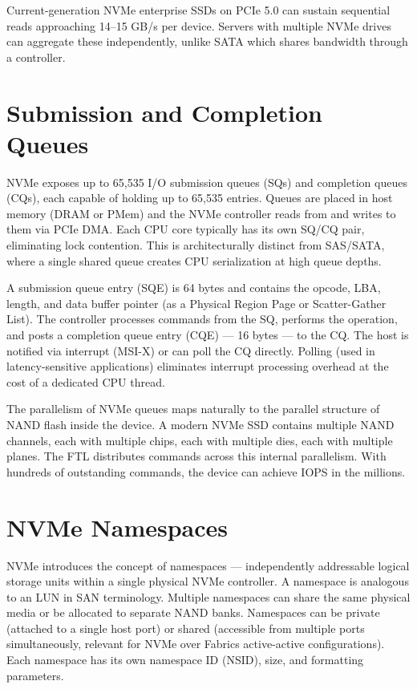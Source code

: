 Current-generation NVMe enterprise SSDs on PCIe 5.0 can sustain sequential reads approaching 14--15 GB/s per device. Servers with multiple NVMe drives can aggregate these independently, unlike SATA which shares bandwidth through a controller.

\section{Submission and Completion Queues}
NVMe exposes up to 65,535 I/O submission queues (SQs) and completion queues (CQs), each capable of holding up to 65,535 entries. Queues are placed in host memory (DRAM or PMem) and the NVMe controller reads from and writes to them via PCIe DMA. Each CPU core typically has its own SQ/CQ pair, eliminating lock contention. This is architecturally distinct from SAS/SATA, where a single shared queue creates CPU serialization at high queue depths.

A submission queue entry (SQE) is 64 bytes and contains the opcode, LBA, length, and data buffer pointer (as a Physical Region Page or Scatter-Gather List). The controller processes commands from the SQ, performs the operation, and posts a completion queue entry (CQE) --- 16 bytes --- to the CQ. The host is notified via interrupt (MSI-X) or can poll the CQ directly. Polling (used in latency-sensitive applications) eliminates interrupt processing overhead at the cost of a dedicated CPU thread.

The parallelism of NVMe queues maps naturally to the parallel structure of NAND flash inside the device. A modern NVMe SSD contains multiple NAND channels, each with multiple chips, each with multiple dies, each with multiple planes. The FTL distributes commands across this internal parallelism. With hundreds of outstanding commands, the device can achieve IOPS in the millions.

\section{NVMe Namespaces}
NVMe introduces the concept of namespaces --- independently addressable logical storage units within a single physical NVMe controller. A namespace is analogous to an LUN in SAN terminology. Multiple namespaces can share the same physical media or be allocated to separate NAND banks. Namespaces can be private (attached to a single host port) or shared (accessible from multiple ports simultaneously, relevant for NVMe over Fabrics active-active configurations). Each namespace has its own namespace ID (NSID), size, and formatting parameters.

